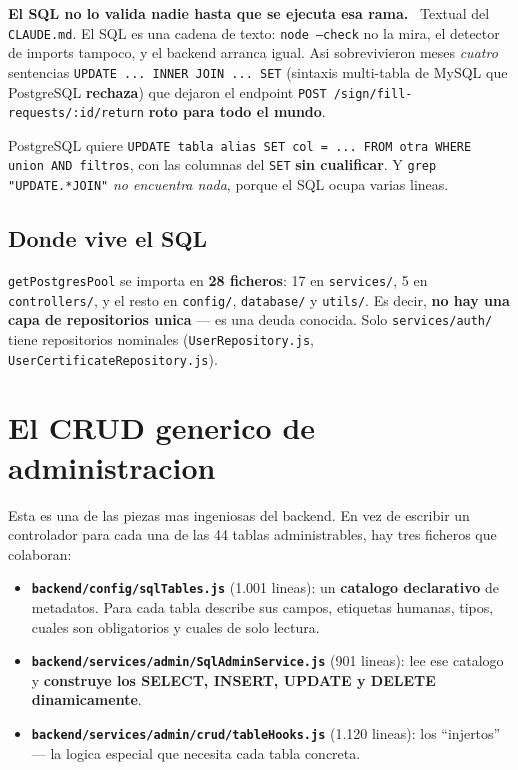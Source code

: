 \documentclass[11pt,a4paper,oneside]{report}
\newenvironment{aviso}[1][Aviso]{%
  \par\medskip
  \colorlet{shadecolor}{orange!14}%
  \begin{shaded}\noindent\textbf{\color{orange!45!black}#1.}\ \ignorespaces}%
  {\end{shaded}\par\medskip}
\newcommand{\rt}[1]{\texttt{#1}}
\begin{document}
\begin{aviso}[El SQL no lo valida nadie hasta que se ejecuta esa rama]
Textual del \rt{CLAUDE.md}. El SQL es una cadena de texto: \rt{node --check} no la mira, el
detector de imports tampoco, y el backend arranca igual. Asi sobrevivieron meses \emph{cuatro}
sentencias \rt{UPDATE ... INNER JOIN ... SET} (sintaxis multi-tabla de MySQL que PostgreSQL
\textbf{rechaza}) que dejaron el endpoint \rt{POST /sign/fill-requests/:id/return}
\textbf{roto para todo el mundo}.

PostgreSQL quiere \rt{UPDATE tabla alias SET col = ... FROM otra WHERE union AND filtros}, con
las columnas del \rt{SET} \textbf{sin cualificar}. Y \rt{grep "UPDATE.*JOIN"} \emph{no
encuentra nada}, porque el SQL ocupa varias lineas.
\end{aviso}

\subsection{Donde vive el SQL}

\rt{getPostgresPool} se importa en \textbf{28 ficheros}: 17 en \rt{services/}, 5 en
\rt{controllers/}, y el resto en \rt{config/}, \rt{database/} y \rt{utils/}. Es decir,
\textbf{no hay una capa de repositorios unica} --- es una deuda conocida. Solo
\rt{services/auth/} tiene repositorios nominales (\rt{UserRepository.js},
\rt{UserCertificateRepository.js}).

\section{El CRUD generico de administracion}

Esta es una de las piezas mas ingeniosas del backend. En vez de escribir un controlador para
cada una de las 44 tablas administrables, hay tres ficheros que colaboran:

\begin{itemize}[leftmargin=1.4em]
  \item \textbf{\rt{backend/config/sqlTables.js}} (1.001 lineas): un \textbf{catalogo
        declarativo} de metadatos. Para cada tabla describe sus campos, etiquetas humanas,
        tipos, cuales son obligatorios y cuales de solo lectura.
  \item \textbf{\rt{backend/services/admin/SqlAdminService.js}} (901 lineas): lee ese catalogo
        y \textbf{construye los SELECT, INSERT, UPDATE y DELETE dinamicamente}.
  \item \textbf{\rt{backend/services/admin/crud/tableHooks.js}} (1.120 lineas): los
        ``injertos'' --- la logica especial que necesita cada tabla concreta.
\end{itemize}
\end{document}
